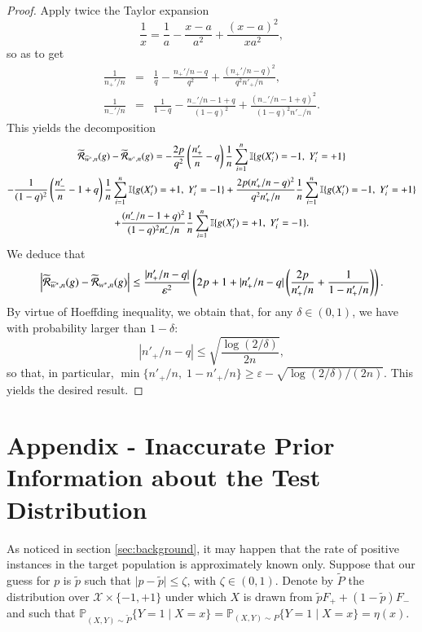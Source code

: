 \documentclass[12pt]{article}
\newcommand{\cR}{{\cal R}}
\begin{document}
\begin{proof}
Apply twice the Taylor expansion
$$
\frac{1}{x}=\frac{1}{a}-\frac{x-a}{a^2}+\frac{(x-a)^2}{xa^2},
$$
so as to get
\begin{eqnarray*}
\frac{1}{n_+'/n}&=&\frac{1}{q}-\frac{n_+'/n-q}{q^2}+\frac{(n_+'/n-q)^2}{q^2 n'_+/n},\\
\frac{1}{n_-'/n}&=&\frac{1}{1-q}-\frac{n_-'/n-1+q}{(1-q)^2}+\frac{(n_-'/n-1+q)^2}{(1-q)^2n'_-/n}.
\end{eqnarray*}
This yields the decomposition
\begin{multline*}
\widetilde{\cR}_{\widehat{w}^*,n}(g)-\widetilde{\cR}_{w^*,n}(g)=-\frac{2p}{q^2}\left(\frac{n'_+}{n}-q\right)\frac{1}{n}\sum_{i=1}^n\mathbb{I}\{g(X'_i)=-1,\; Y'_i=+1 \}\\
-\frac{1}{(1-q)^2}\left(\frac{n'_-}{n}-1+q\right)\frac{1}{n}\sum_{i=1}^n\mathbb{I}\{g(X'_i)=+1,\; Y'_i=-1 \}+\frac{2p(n_+'/n-q)^2}{q^2 n'_+/n}\frac{1}{n}\sum_{i=1}^n\mathbb{I}\{g(X'_i)=-1,\; Y'_i=+1 \}\\
+\frac{(n_-'/n-1+q)^2}{(1-q)^2n'_-/n}\frac{1}{n}\sum_{i=1}^n\mathbb{I}\{g(X'_i)=+1,\; Y'_i=-1 \}.
\end{multline*}
We deduce that
\begin{equation*}
\left\vert
\widetilde{\cR}_{\widehat{w}^*,n}(g)-\widetilde{\cR}_{w^*,n}(g)
\right\vert \leq \frac{\vert n'_+/n-q\vert}{\varepsilon^2}\left( 2p + 1 +\vert n'_+/n-q\vert \left( \frac{2p}{n'_+/n}+\frac{1}{1-n'_+/n} \right) \right).
\end{equation*}
By virtue of Hoeffding inequality, we obtain that, for any $\delta\in (0,1)$, we have with probability larger than $1-\delta$:
$$
\left\vert n'_+/n-q\right\vert \leq \sqrt{\frac{\log(2/\delta)}{2n}},
$$
so that, in particular, $\min\{ n'_+/n,\; 1- n'_+/n\}\geq \varepsilon-\sqrt{\log(2/\delta)/(2n)}$. This yields the desired result.
\end{proof}
 


\section*{Appendix - Inaccurate Prior Information about the Test Distribution}
\label{sec:inacc_proba}
As noticed in section \ref{sec:background}, it may happen that the rate of positive instances in the target population is approximately known only. Suppose that our guess for $p$ is $\widetilde{p}$ such that $\vert p-\widetilde{p} \vert\leq \zeta$, with $\zeta\in (0,1)$. Denote by $\widetilde{P}$ the distribution over $\mathcal{X}\times\{-1,+1\}$ under which $X$ is drawn from $\widetilde{p}F_++(1-\widetilde{p})F_-$ and such that $\mathbb{P}_{(X,Y)\sim\widetilde{P}}\{Y=1\mid X=x\}=\mathbb{P}_{(X,Y)\sim P}\{Y=1\mid X=x\}=\eta(x)$.
\end{document}
